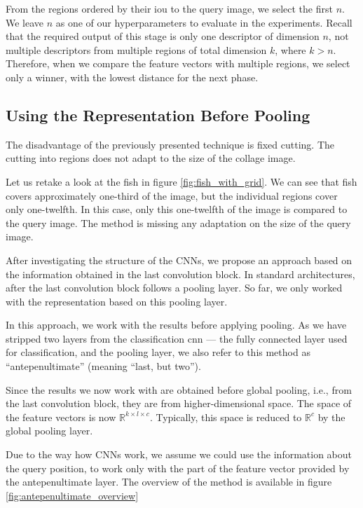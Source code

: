 From the regions ordered by their \acrshort{iou} to the query image, we select the first $n$. We leave $n$ as one of our hyperparameters to evaluate in the experiments. Recall that the required output of this stage is only one descriptor of dimension $n$, not multiple descriptors from multiple regions of total dimension $k$, where $k > n$. Therefore, when we compare the feature vectors with multiple regions, we select only a winner, with the lowest distance for the next phase. 

\subsection{Using the Representation Before Pooling}

The disadvantage of the previously presented technique is fixed cutting. The cutting into regions does not adapt to the size of the collage image. 

Let us retake a look at the fish in figure \ref{fig:fish_with_grid}. We can see that fish covers approximately one-third of the image, but the individual regions cover only one-twelfth. In this case, only this one-twelfth of the image is compared to the query image. The method is missing any adaptation on the size of the query image.

After investigating the structure of the CNNs, we propose an approach based on the information obtained in the last convolution block. In standard architectures, after the last convolution block follows a pooling layer. So far, we only worked with the representation based on this pooling layer.

In this approach, we work with the results before applying pooling. As we have stripped two layers from the classification \acrshort{cnn} --- the fully connected layer used for classification, and the pooling layer, we also refer to this method as ``antepenultimate'' (meaning ``last, but two'').

Since the results we now work with are obtained before global pooling, i.e., from the last convolution block, they are from higher-dimensional space. The space of the feature vectors is now $\mathbb{R}^{k\times l \times c}$. Typically, this space is reduced to $\mathbb{R}^c$ by the global pooling layer.

Due to the way how CNNs work, we assume we could use the information about the query position, to work only with the part of the feature vector provided by the antepenultimate layer. The overview of the method is available in figure \ref{fig:antepenultimate_overview}


